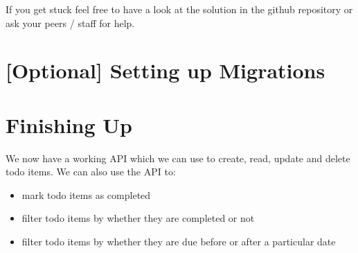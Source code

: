 \documentclass{csse4400}
\begin{document}
If you get stuck feel free to have a look at the solution in the github repository or ask your peers / staff for help.

\section{[Optional] Setting up Migrations}



\section{Finishing Up}

We now have a working API which we can use to create, read, update and delete todo items. We can also use the API to:

\begin{itemize}
  \item mark todo items as completed
  \item filter todo items by whether they are completed or not
  \item filter todo items by whether they are due before or after a particular date
\end{itemize}




\end{document}
